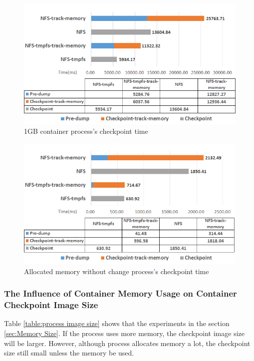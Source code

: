 \begin{figure}[htbp]
\begin{center}
\includegraphics[width=14cm]{figure/1GB.png}
\end{center}
\caption{1GB container process's checkpoint time}
\label{fig:1GB}
\end{figure}

\begin{figure}[htbp]
\begin{center}
\includegraphics[width=14cm]{figure/allocate_mem_without_change.png}
\end{center}
\caption{Allocated memory without change process's checkpoint time}
\label{fig:allocate memory}
\end{figure}

\subsubsection{The Influence of Container Memory Usage on Container Checkpoint Image Size}
Table \ref{table:process image size} shows that the experiments in the section \ref{sec:Memory Size}. If the process uses more memory, the checkpoint image size will be larger. However, although process allocates memory a lot, the checkpoint size still small unless the memory be used.

